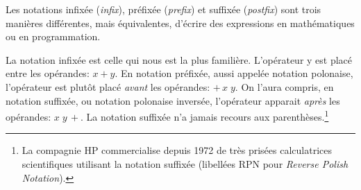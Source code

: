 \begin{exercice}
  \label{ex:informatique:notation}
  Les notations infixée (\emph{infix}),
  préfixée (\emph{prefix}) et
  suffixée (\emph{postfix}) sont trois
  manières différentes, mais équivalentes, d'écrire des expressions en
  mathématiques ou en programmation.

  La notation infixée est celle qui nous est la plus familière.
  L'opérateur y est placé entre les opérandes: $x + y$. En notation
  préfixée, aussi appelée notation polonaise, l'opérateur est plutôt
  placé \emph{avant} les opérandes: $+\, x\; y$. On l'aura compris, en
  notation suffixée, ou notation polonaise inversée, l'opérateur
  apparait \emph{après} les opérandes: $x\; y\, +$. La notation
  suffixée n'a jamais recours aux parenthèses.\footnote{%
    La compagnie HP commercialise depuis 1972 de très prisées
    calculatrices scientifiques utilisant la notation suffixée
    (libellées RPN pour \emph{Reverse Polish Notation}).}


\end{exercice}
